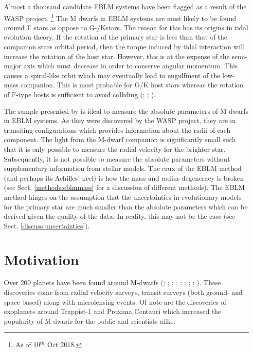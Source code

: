 Almost a thousand candidate EBLM systems have been flagged as a result of the WASP project.%
\footnote{As of 10$^{th}$ Oct 2018.}
%
The M dwarfs in EBLM systems are most likely to be found around F stars as oppose to G-/Kstars. The reason for this has its origins in tidal evolution theory. If the rotation of the primary star is less than that of the companion stars orbital period, then the torque induced by tidal interaction will increase the rotation of the host star. However, this is at the expense of the semi-major axis which must decrease in order to conserve angular momentum. This causes a spiral-like orbit which may eventually lead to engulfment of the low-mass companion. This is most probable for G/K host stars whereas the rotation of F-type hosts is sufficient to avoid colliding (\citealt{2017IAUS..328..308P}; \citealt{2011A&A...525A..68B}; \citealt{2011A&A...533A..83B}).

The sample presented by \citet{Triaud2017} is ideal to measure the absolute parameters of M-dwarfs in EBLM systems. As they were discovered by the WASP project, they are in transiting configurations which provides information about the radii of each component. The light from the M-dwarf companion is significantly small such that it is only possible to measure the radial velocity for the brighter star. Subsequently, it is not possible to measure the absolute parameters without supplementary information from stellar models. The crux of the EBLM method (and perhaps its Achilles' heel) is how the mass and radius degeneracy is broken (see Sect. \ref{methods:eblmmass} for a discussion of different methods). The EBLM method hinges on the assumption that the uncertainties in evolutionary models for the primary star are much smaller than the absolute parameters which can be derived given the quality of the data. In reality, this may not be the case (see Sect. \ref{discuss:uncertainties}). 



 




\section{Motivation}

Over 200 planets have been found around M-dwarfs (\citealt{2013A&A...551A..48A}; \citealt{2014Sci...344..277Q}; \citealt{2014ApJ...784...45R}; \citealt{2015ApJ...800...99T}; \citealt{2015ApJ...804...10C}; \citealt{2015ApJ...809....7B}; \citealt{2016ApJ...818...87S}; \citealt{2016Natur.536..437A}; \citealt{2017Natur.542..456G}). These discoveries come from radial velocity surveys, transit surveys (both ground- and space-based) along with microlensing events. Of note are the discoveries of exoplanets around Trappist-1 \citep{2017Natur.542..456G} and Proxima Centauri \citep{2016Natur.536..437A} which increased the popularity of M-dwarfs for the public and scientists alike. 

